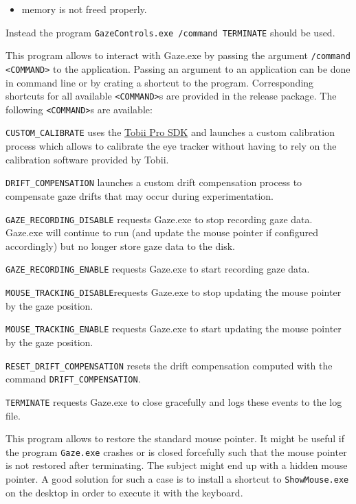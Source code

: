 \documentclass[a4paper,oneside]{book}
\begin{document}
\begin{description}
\begin{itemize}
            \item memory is not freed properly.
        \end{itemize}
        Instead the program \texttt{GazeControls.exe /command TERMINATE} should be used.
    \item[GazeControl.ext] This program allows to interact with Gaze.exe by passing the argument \texttt{/command <COMMAND>} to the application.
        Passing an argument to an application can be done in command line or by crating a shortcut to the program.
        Corresponding shortcuts for all available \texttt{<COMMAND>}s are provided in the release package.
        The following \texttt{<COMMAND>}s are available:
        \begin{description}
            \item{\texttt{CUSTOM\_CALIBRATE}} uses the \href{http://developer.tobii.com/tobii-pro-sdk/}{Tobii Pro SDK} and launches a custom calibration process which allows to calibrate the eye tracker without having to rely on the calibration software provided by Tobii.
            \item{\texttt{DRIFT\_COMPENSATION}} launches a custom drift compensation process to compensate gaze drifts that may occur during experimentation.
            \item{\texttt{GAZE\_RECORDING\_DISABLE}} requests Gaze.exe to stop recording gaze data.
                Gaze.exe will continue to run (and update the mouse pointer if configured accordingly) but no longer store gaze data to the disk.
            \item{\texttt{GAZE\_RECORDING\_ENABLE}} requests Gaze.exe to start recording gaze data.
            \item{\texttt{MOUSE\_TRACKING\_DISABLE}}requests Gaze.exe to stop updating the mouse pointer by the gaze position.
            \item{\texttt{MOUSE\_TRACKING\_ENABLE}} requests Gaze.exe to start updating the mouse pointer by the gaze position.
            \item{\texttt{RESET\_DRIFT\_COMPENSATION}} resets the drift compensation computed with the command \texttt{DRIFT\_COMPENSATION}.
            \item{\texttt{TERMINATE}} requests Gaze.exe to close gracefully and logs these events to the log file.
        \end{description}
    \item[ShowMouse.exe] This program allows to restore the standard mouse pointer.
        It might be useful if the program \texttt{Gaze.exe} crashes or is closed forcefully such that the mouse pointer is not restored after terminating.
        The subject might end up with a hidden mouse pointer.
        A good solution for such a case is to install a shortcut to \texttt{ShowMouse.exe} on the desktop in order to execute it with the keyboard.
\end{description}
\end{document}
